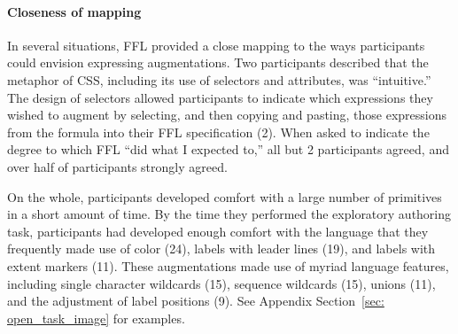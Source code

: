 


\paragraph{Closeness of mapping}

In several situations, FFL provided a close mapping to the ways participants could envision expressing augmentations. Two participants described that the metaphor of CSS, including its use of selectors and attributes, was ``intuitive.'' The design of selectors allowed participants to indicate which expressions they wished to augment by selecting, and then copying and pasting, those expressions from the formula into their FFL specification (2). When asked to indicate the degree to which FFL ``did what I expected to,'' all but 2 participants agreed, and over half of participants strongly agreed.

On the whole, participants developed comfort with a large number of primitives in a short amount of time. By the time they performed the exploratory authoring task, participants had developed enough comfort with the language that they frequently made use of color (24), labels with leader lines (19), and labels with extent markers (11). These augmentations made use of myriad language features, including single character wildcards (15), sequence wildcards (15), unions (11), and the adjustment of label positions (9). See Appendix Section~\ref{sec: open_task_image} for examples.

